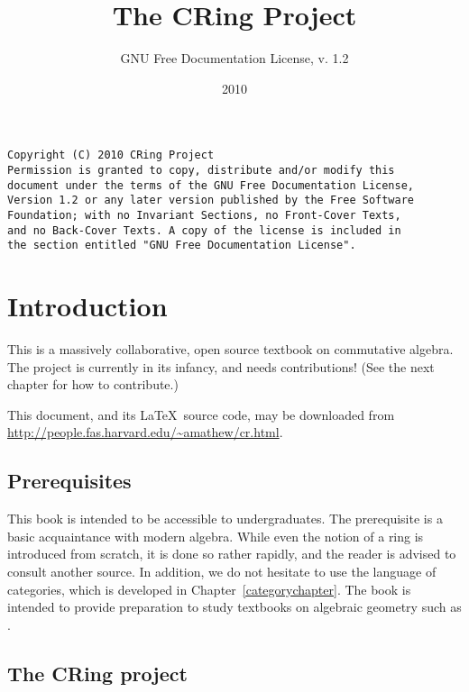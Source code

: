 
\nocite{*}

\title{The CRing Project}
\author{GNU Free Documentation License, v. 1.2}
\date{2010}

\maketitle
\begin{verbatim}
Copyright (C) 2010 CRing Project 
Permission is granted to copy, distribute and/or modify this
document under the terms of the GNU Free Documentation License,
Version 1.2 or any later version published by the Free Software
Foundation; with no Invariant Sections, no Front-Cover Texts,
and no Back-Cover Texts. A copy of the license is included in
the section entitled "GNU Free Documentation License". \end{verbatim}


\fancyhead{}
\fancyfoot{}
\tableofcontents

\newpage 


\pagestyle{fancy}



\chapter*{Introduction}

This  is a massively collaborative, open source textbook on
commutative algebra. The project is currently in its infancy, and needs
contributions! (See the next chapter for how to contribute.)

This document, and
its \LaTeX\ source code, may be downloaded from
\url{http://people.fas.harvard.edu/~amathew/cr.html}.

\section*{Prerequisites}
This book is intended to be accessible to undergraduates. The prerequisite  is a basic acquaintance with modern
algebra. While even the notion of a ring is introduced from scratch, it is
done so rather rapidly, and the reader is advised to consult another source.
In addition, we do not hesitate to use the language of categories,
which is developed in Chapter~\ref{categorychapter}. The book is intended to
provide preparation to study textbooks on algebraic geometry such as
\cite{Ha77}.

\section*{The CRing project}

